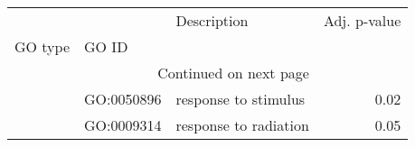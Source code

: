 \begin{longtable}{lllr}
\toprule
   &            &            Description &  Adj. p-value \\
GO type & GO ID &                        &               \\
\midrule
\endhead
\midrule
\multicolumn{3}{r}{{Continued on next page}} \\
\midrule
\endfoot

\bottomrule
\endlastfoot
\multirow{2}{*}{BP} & GO:0050896 &   response to stimulus &          0.02 \\
   & GO:0009314 &  response to radiation &          0.05 \\
\end{longtable}
